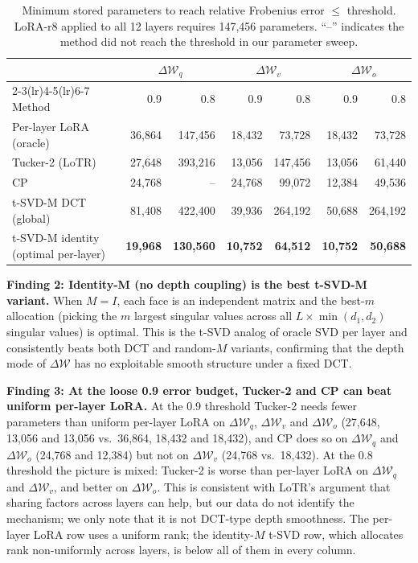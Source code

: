 \documentclass{article}
\newcommand{\DeltaW}{\Delta\mathcal{W}}
\theoremstyle{plain}
\begin{document}
\begin{table}[h]
\centering
\caption{Minimum stored parameters to reach relative Frobenius error $\leq$ threshold.
LoRA-r8 applied to all 12 layers requires 147,456 parameters.
``--'' indicates the method did not reach the threshold in our parameter sweep.}
\label{tab:params}
\small
\begin{tabular}{lrrrrrr}
\toprule
& \multicolumn{2}{c}{$\DeltaW_q$} & \multicolumn{2}{c}{$\DeltaW_v$} & \multicolumn{2}{c}{$\DeltaW_o$} \\
\cmidrule(lr){2-3}\cmidrule(lr){4-5}\cmidrule(lr){6-7}
Method & 0.9 & 0.8 & 0.9 & 0.8 & 0.9 & 0.8 \\
\midrule
Per-layer LoRA (oracle) & 36,864 & 147,456 & 18,432 & 73,728 & 18,432 & 73,728 \\
Tucker-2 (LoTR) & 27,648 & 393,216 & 13,056 & 147,456 & 13,056 & 61,440 \\
CP & 24,768 & -- & 24,768 & 99,072 & 12,384 & 49,536 \\
t-SVD-M DCT (global) & 81,408 & 422,400 & 39,936 & 264,192 & 50,688 & 264,192 \\
t-SVD-M identity (optimal per-layer) & \textbf{19,968} & \textbf{130,560} & \textbf{10,752} & \textbf{64,512} & \textbf{10,752} & \textbf{50,688} \\
\bottomrule
\end{tabular}
\end{table}

\textbf{Finding 2: Identity-M (no depth coupling) is the best t-SVD-M variant.}
When $M = I$, each face is an independent matrix and the best-$m$ allocation
(picking the $m$ largest singular values across all $L \times \min(d_1,d_2)$
singular values) is optimal.
This is the t-SVD analog of oracle SVD per layer and consistently beats both DCT
and random-$M$ variants, confirming that the depth mode of $\DeltaW$ has no
exploitable smooth structure under a fixed DCT.

\textbf{Finding 3: At the loose 0.9 error budget, Tucker-2 and CP can beat uniform per-layer LoRA.}
At the 0.9 threshold Tucker-2 needs fewer parameters than uniform per-layer LoRA on $\DeltaW_q$, $\DeltaW_v$
and $\DeltaW_o$ (27,648, 13,056 and 13,056 vs.\ 36,864, 18,432 and 18,432), and CP does so on $\DeltaW_q$ and
$\DeltaW_o$ (24,768 and 12,384) but not on $\DeltaW_v$ (24,768 vs.\ 18,432).
At the 0.8 threshold the picture is mixed: Tucker-2 is worse than per-layer LoRA on $\DeltaW_q$ and
$\DeltaW_v$, and better on $\DeltaW_o$.
This is consistent with LoTR's argument that sharing factors across layers can help,
but our data do not identify the mechanism; we only note that it is not DCT-type depth smoothness.
The per-layer LoRA row uses a uniform rank; the identity-$M$ t-SVD row, which allocates rank
non-uniformly across layers, is below all of them in every column.
\end{document}
